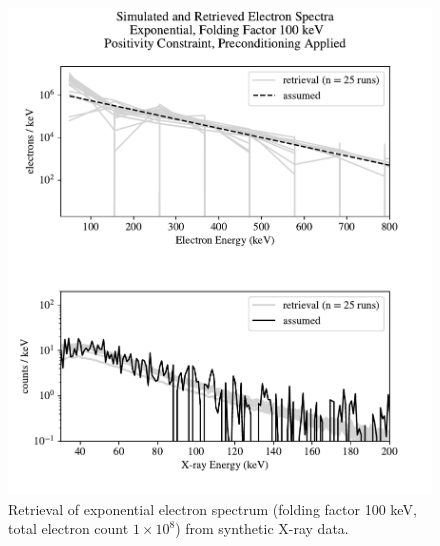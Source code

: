 \begin{figure}[p]
    \centering
    \includegraphics[width=\textwidth]{figures/chapter_4/synthetic_data_examples/exponential_folding_100keV_posonly_preconditioning_1e8_particles}
    \caption{Retrieval of exponential electron spectrum (folding factor 100 keV, total electron count $1\times10^8$) from synthetic X-ray data.}
    \label{why_non_negative_is_good}
\end{figure}

